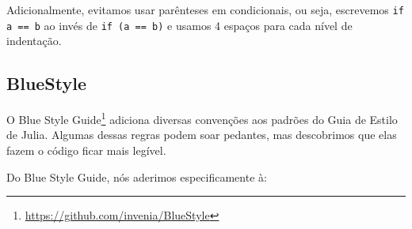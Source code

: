 \documentclass[
  notoc %
]{tufte-book}
\DeclareRobustCommand{\href}[2]{#2\footnote{\url{#1}}}
\newcommand{\passthrough}[1]{#1}
\begin{document}
Adicionalmente, evitamos usar parênteses em condicionais, ou seja,
escrevemos \passthrough{\lstinline!if a == b!} ao invés de
\passthrough{\lstinline!if (a == b)!} e usamos 4 espaços para cada nível
de indentação.

\hypertarget{bluestyle}{%
\subsection{BlueStyle}\label{bluestyle}}

O \href{https://github.com/invenia/BlueStyle}{Blue Style Guide} adiciona
diversas convenções aos padrões do Guia de Estilo de Julia. Algumas
dessas regras podem soar pedantes, mas descobrimos que elas fazem o
código ficar mais legível.

Do Blue Style Guide, nós aderimos especificamente à:
\end{document}
